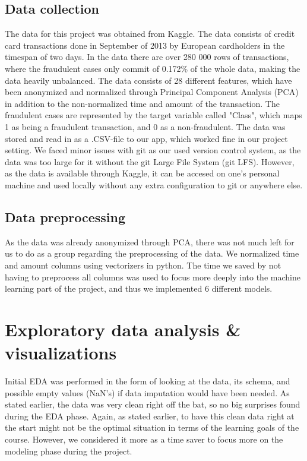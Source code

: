 \documentclass{article}
\begin{document}
\subsection{Data collection}

The data for this project was obtained from Kaggle. The data consists of credit card transactions done in September of 2013 by European cardholders in the timespan of two days. In the data there are over 280 000 rows of transactions, where the fraudulent cases only commit of 0.172\% of the whole data, making the data heavily unbalanced. The data consists of 28 different features, which have been anonymized and normalized through Principal Component Analysis (PCA) in addition to the non-normalized time and amount of the transaction. The fraudulent cases are represented by the target variable called "Class", which maps 1 as being a fraudulent transaction, and 0 as a non-fraudulent. The data was stored and read in as a .CSV-file to our app, which worked fine in our project setting. We faced minor issues with git as our used version control system, as the data was too large for it without the git Large File System (git LFS). However, as the data is available through Kaggle, it can be accesed on one's personal machine and used locally without any extra configuration to git or anywhere else.

\subsection{Data preprocessing}

As the data was already anonymized through PCA, there was not much left for us to do as a group regarding the preprocessing of the data. We normalized time and amount columns using vectorizers in python. The time we saved by not having to preprocess all columns was used to focus more deeply into the machine learning part of the project, and thus we implemented 6 different models.

\section{Exploratory data analysis \& visualizations}


Initial EDA was performed in the form of looking at the data, its schema, and possible empty values (NaN's) if data imputation would have been needed. As stated earlier, the data was very clean right off the bat, so no big surprises found during the EDA phase. Again, as stated earlier, to have this clean data right at the start might not be the optimal situation in terms of the learning goals of the course. However, we considered it more as a time saver to focus more on the modeling phase during the project.
\end{document}
